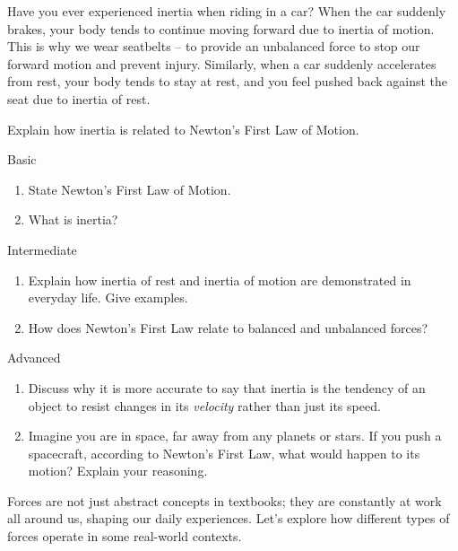 \begin{example}
Have you ever experienced inertia when riding in a car?  When the car suddenly brakes, your body tends to continue moving forward due to inertia of motion.  This is why we wear seatbelts – to provide an unbalanced force to stop our forward motion and prevent injury.  Similarly, when a car suddenly accelerates from rest, your body tends to stay at rest, and you feel pushed back against the seat due to inertia of rest.
\end{example}

\begin{stopandthink}
Explain how inertia is related to Newton's First Law of Motion.
\end{stopandthink}

\begin{tieredquestions}{Basic}
\begin{enumerate}
    \item State Newton's First Law of Motion.
    \item What is inertia?
\end{enumerate}
\end{tieredquestions}

\begin{tieredquestions}{Intermediate}
\begin{enumerate}
    \item Explain how inertia of rest and inertia of motion are demonstrated in everyday life. Give examples.
    \item How does Newton's First Law relate to balanced and unbalanced forces?
\end{enumerate}
\end{tieredquestions}

\begin{tieredquestions}{Advanced}
\begin{enumerate}
    \item  Discuss why it is more accurate to say that inertia is the tendency of an object to resist changes in its \textit{velocity} rather than just its speed.
    \item  Imagine you are in space, far away from any planets or stars.  If you push a spacecraft, according to Newton's First Law, what would happen to its motion? Explain your reasoning.
\end{enumerate}
\end{tieredquestions}


\FloatBarrier
\1

Forces are not just abstract concepts in textbooks; they are constantly at work all around us, shaping our daily experiences. Let's explore how different types of forces operate in some real-world contexts.

